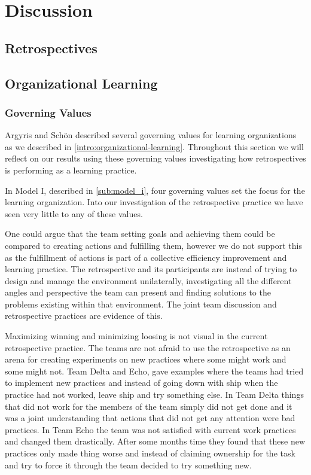 \chapter{Discussion}
\section{Retrospectives}
\section{Organizational Learning} %
\label{sec:organizational_learning}
\subsection{Governing Values}
Argyris and Schön\cite{Argyris1996} described several governing values for learning organizations as we described in \autoref{intro:organizational-learning}. Throughout this section we will reflect on our results using these governing values investigating how retrospectives is performing as a learning practice. 

In Model I, described in \autoref{sub:model_i}, four governing values set the focus for the learning organization. Into our investigation of the retrospective practice we have seen very little to any of these values. 

One could argue that the team setting goals and achieving them could be compared to creating actions and fulfilling them, however we do not support this as the fulfillment of actions is part of a collective efficiency improvement and learning practice. The retrospective and its participants are instead of trying to design and manage the environment unilaterally, investigating all the different angles and perspective the team can present and finding solutions to the problems existing within that environment. The joint team discussion and retrospective practices are evidence of this. 

Maximizing winning and minimizing loosing is not visual in the current retrospective practice. The teams are not afraid to use the retrospective as an arena for creating experiments on new practices where some might work and some might not. Team Delta and Echo, gave examples where the teams had tried to implement new practices and instead of going down with ship when the practice had not worked, leave ship and try something else. In Team Delta things that did not work for the members of the team simply did not get done and it was a joint understanding that actions that did not get any attention were bad practices. In Team Echo the team was not satisfied with current work practices and changed them drastically. After some months time they found that these new practices only made thing worse and instead of claiming ownership for the task and try to force it through the team decided to try something new. 

